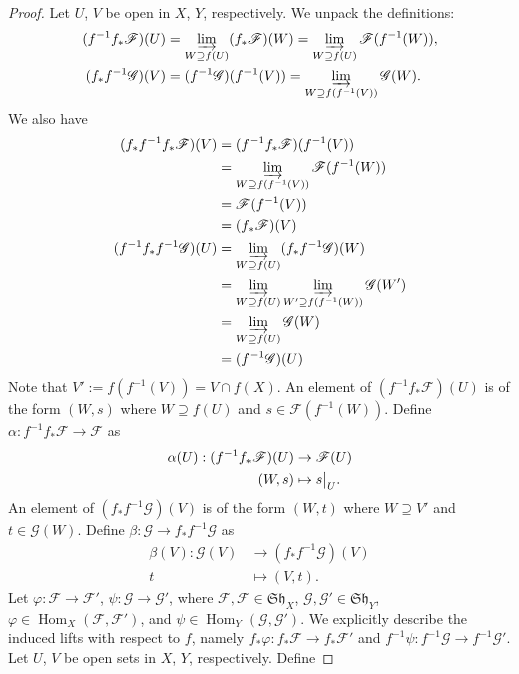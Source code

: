 \documentclass{article}
\newcommand{\fF}{\mathscr{F}}
\newcommand{\fG}{\mathscr{G}}
\DeclareMathOperator{\Hom}{Hom}
\newcommand\restr[2]{{%
  \left.\kern-\nulldelimiterspace %
  #1 %
  \vphantom{\big|} %
  \right|_{#2} %
}}
\begin{document}
\begin{enumerate} [label=\textbf{\arabic*.}, leftmargin=0em]
\begin{proof}
    Let $U$, $V$ be open in $X$, $Y$, respectively. We unpack the definitions:
    \begin{align*}
        (f^{-1} f_* \fF)(U) & = \varinjlim_{W \supseteq f(U)} (f_* \fF)(W) = \varinjlim_{W \supseteq f(U)} \fF(f^{-1}(W)), \\ 
        (f_* f^{-1} \fG)(V) & = (f^{-1} \fG)(f^{-1}(V)) = \varinjlim_{W \supseteq f(f^{-1}(V))} \fG(W).
    \end{align*}
    We also have
    \begin{align*}
        (f_*f^{-1}f_* \fF)(V) & = (f^{-1} f_* \fF)(f^{-1}(V)) \\
        & = \varinjlim_{W \supseteq f(f^{-1}(V))} \fF(f^{-1}(W)) \\
        & = \fF(f^{-1}(V)) \\
        & = (f_* \fF)(V) \\
        (f^{-1} f_* f^{-1} \fG)(U) & = \varinjlim_{W \supseteq f(U)} (f_* f^{-1} \fG)(W) \\
        & = \varinjlim_{W \supseteq f(U)} \varinjlim_{W' \supseteq f(f^{-1}(W))} \fG(W') \\
        & = \varinjlim_{W \supseteq f(U)} \fG(W) \\
        & = (f^{-1} \fG)(U)
    \end{align*}
    Note that $V' := f(f^{-1}(V)) = V \cap f(X)$. An element of $(f^{-1} f_* \fF)(U)$ is of the form $(W, s)$ where $W \supseteq f(U)$ and $s \in \fF(f^{-1}(W))$. Define $\alpha : f^{-1} f_* \fF \to \fF$ as
    \begin{align*}
        \alpha(U) : (f^{-1}f_* \fF)(U) & \to \fF(U) \\
        (W, s) & \mapsto \restr{s}{U}.
    \end{align*}
    An element of $(f_* f^{-1} \fG)(V)$ is of the form $(W, t)$ where $W \supseteq V'$ and $t \in \fG(W)$. Define $\beta : \fG \to f_* f^{-1} \fG$ as
    \begin{align*}
        \beta(V) : \fG(V) & \to (f_* f^{-1} \fG)(V) \\
        t & \mapsto (V, t).
    \end{align*}
    Let $\varphi : \fF \to \fF'$, $\psi : \fG \to \fG'$, where $\fF, \fF \in \mathfrak{Sh}_X$, $\fG, \fG' \in \mathfrak{Sh}_Y$, $\varphi \in \Hom_X(\fF, \fF')$, and $\psi \in \Hom_Y(\fG, \fG')$. We explicitly describe the induced lifts with respect to $f$, namely $f_*\varphi : f_* \fF \to f_* \fF'$ and $f^{-1} \psi : f^{-1} \fG \to f^{-1} \fG'$. Let $U$, $V$ be open sets in $X$, $Y$, respectively. Define

\end{proof}
\end{enumerate}
\end{document}

